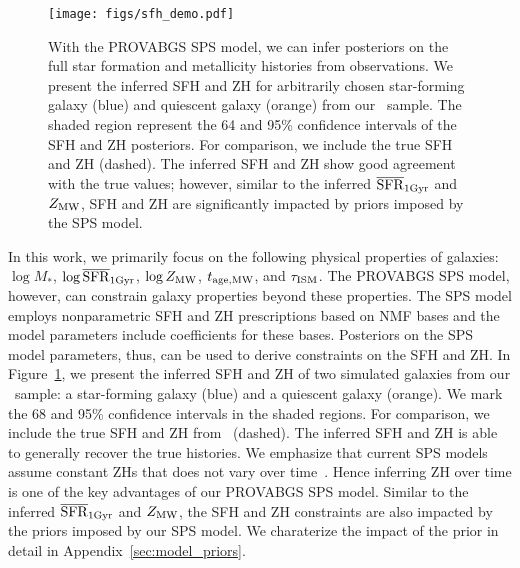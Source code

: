 \begin{figure}
\begin{center}
\texttt{[image: figs/sfh\_demo.pdf]}
    \caption{
        With the {\sc PROVABGS} SPS model, we can infer posteriors on the full
        star formation and metallicity histories from observations. 
        We present the inferred SFH and ZH for arbitrarily chosen star-forming
        galaxy (blue) and quiescent galaxy (orange) from our \lgal~sample.
        The shaded region represent the 64 and 95\% confidence intervals of the
        SFH and ZH posteriors. 
        For comparison, we include the true SFH and ZH (dashed). 
        The inferred SFH and ZH show good agreement with the true values;
        however, similar to the inferred $\overline{\rm SFR}_{\rm 1Gyr}$ and $Z_{\rm MW}$, SFH and ZH are
        significantly impacted by priors imposed by the SPS model. 
    } \label{fig:sfh_demo}
\end{center}
\end{figure}
In this work, we primarily focus on the following physical properties of
galaxies: $\log M_*$, $\log\overline{\rm SFR}_{\rm 1Gyr}$, $\log Z_{\rm MW}$, $t_{\rm age, MW}$, and $\tau_{\rm ISM}$. 
The {\sc PROVABGS} SPS model, however, can constrain galaxy properties beyond
these properties. 
The SPS model employs nonparametric SFH and ZH prescriptions based on NMF bases
and the model parameters include coefficients for these bases. 
Posteriors on the SPS model parameters, thus, can be used to derive constraints
on the SFH and ZH. 
In Figure~\ref{fig:sfh_demo}, we present the inferred SFH and ZH of two
simulated galaxies from our \lgal~sample: a star-forming galaxy (blue) and a
quiescent galaxy (orange). 
We mark the 68 and 95\% confidence intervals in the shaded regions. 
For comparison, we include the true SFH and ZH from \lgal~(dashed).  
The inferred SFH and ZH is able to generally recover the true histories. 
We emphasize that current SPS models assume constant ZHs that does not vary
over time~\citep{carnall2017, leja2019}. 
Hence inferring ZH over time is one of the key advantages of our {\sc PROVABGS}
SPS model. 
Similar to the inferred $\overline{\rm SFR}_{\rm 1Gyr}$ and $Z_{\rm MW}$, the SFH and ZH constraints are
also impacted by the priors imposed by our SPS model. 
We charaterize the impact of the prior in detail in
Appendix~\ref{sec:model_priors}.

